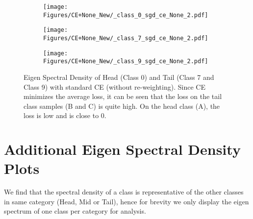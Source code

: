 \documentclass{article}
\begin{document}
\begin{figure}[t]
\begin{subfigure}{.33\textwidth}
  \centering
  \texttt{[image: Figures/CE+None\_New/\_class\_0\_sgd\_ce\_None\_2.pdf]}  

  \label{fig:sub-first3}
\end{subfigure}
\begin{subfigure}{.33\textwidth}
  \centering
  \texttt{[image: Figures/CE+None\_New/\_class\_7\_sgd\_ce\_None\_2.pdf]}  

  \label{fig:sub-second4}
\end{subfigure}
\begin{subfigure}{.33\textwidth}
  \centering
  \texttt{[image: Figures/CE+None\_New/\_class\_9\_sgd\_ce\_None\_2.pdf]}  

  \label{fig:sub-second5}
\end{subfigure}

\caption{Eigen Spectral Density of Head (Class 0) and Tail (Class 7 and Class 9) with standard CE (without re-weighting). Since CE minimizes the average loss, it can be seen that the loss on the tail class samples (B and C) is quite high. On the head class (A), the loss is low and  is close to 0.}
\label{fig:app_ce_none}

\end{figure}




    








\section{Additional Eigen Spectral Density Plots}
\label{app:eigen_spectral_density_plots}
We find that the spectral density of a class is representative of the other classes in same category (Head, Mid or Tail), hence for brevity we only display the eigen spectrum of one class per category for analysis.
\end{document}
